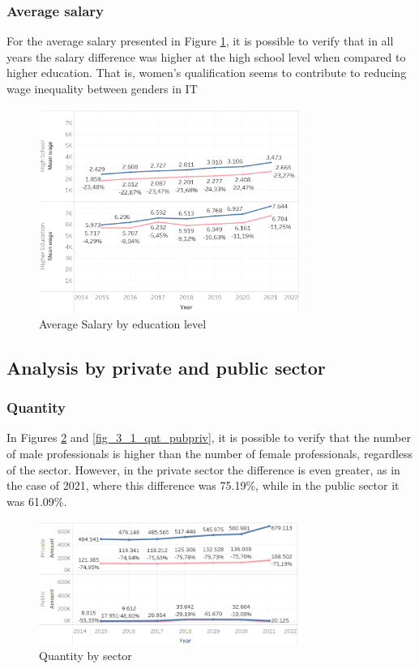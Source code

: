 \subsubsection{Average salary}

For the average salary presented in Figure \ref{fig_2_sal_educ}, it is possible to verify that in all years the salary difference was higher at the high school level when compared to higher education. That is, women’s qualification seems to contribute to reducing wage inequality between genders in IT

\begin{figure}[htbp]
	\centerline{
		\includegraphics[width=85mm]{assets/2_sal_educ.PNG}
	}
	\caption{Average Salary by education level}
	\label{fig_2_sal_educ}
\end{figure}

\subsection{Analysis by private and public sector}  \label{sub:privpub}

\subsubsection{Quantity}

In Figures \ref{fig_3_qnt_pubpriv} and \ref{fig_3_1_qnt_pubpriv}, it is possible to verify that the number of male professionals is higher than the number of female professionals, regardless of the sector. However, in the private sector the difference is even greater, as in the case of 2021, where this difference was 75.19\%, while in the public sector it was 61.09\%.

\begin{figure}[htbp]
	\centerline{
		\includegraphics[width=85mm]{assets/3_qnt_pubpriv.PNG}
	}
	\caption{Quantity by sector}
	\label{fig_3_qnt_pubpriv}
\end{figure}


